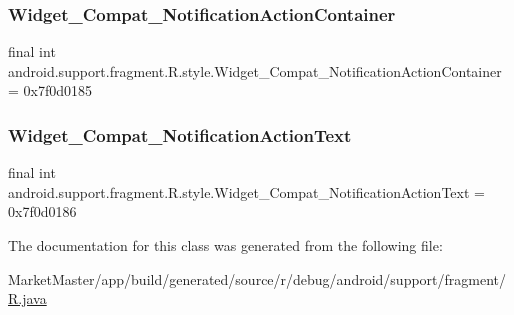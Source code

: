 \subsubsection{\texorpdfstring{Widget\+\_\+\+Compat\+\_\+\+Notification\+Action\+Container}{Widget\_Compat\_NotificationActionContainer}}
{\footnotesize\ttfamily final int android.\+support.\+fragment.\+R.\+style.\+Widget\+\_\+\+Compat\+\_\+\+Notification\+Action\+Container = 0x7f0d0185\hspace{0.3cm}{\ttfamily [static]}}

\mbox{\label{classandroid_1_1support_1_1fragment_1_1R_1_1style_a144bc7c25f26c31617e761b0d0ffc4a5}} 
\subsubsection{\texorpdfstring{Widget\+\_\+\+Compat\+\_\+\+Notification\+Action\+Text}{Widget\_Compat\_NotificationActionText}}
{\footnotesize\ttfamily final int android.\+support.\+fragment.\+R.\+style.\+Widget\+\_\+\+Compat\+\_\+\+Notification\+Action\+Text = 0x7f0d0186\hspace{0.3cm}{\ttfamily [static]}}



The documentation for this class was generated from the following file\+:\begin{DoxyCompactItemize}
\item 
Market\+Master/app/build/generated/source/r/debug/android/support/fragment/\mbox{\hyperlink{debug_2android_2support_2fragment_2R_8java}{R.\+java}}\end{DoxyCompactItemize}
